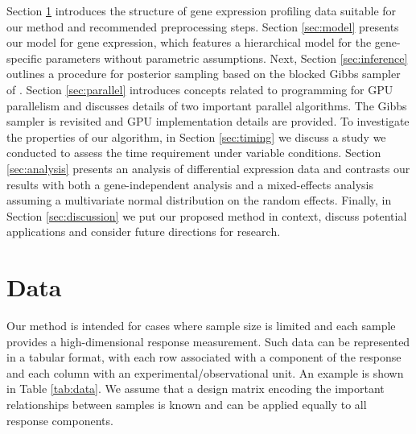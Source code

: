 Section \ref{sec:data} introduces the structure of gene expression profiling data suitable for our method and recommended preprocessing steps. Section \ref{sec:model} presents our model for gene expression, which features a hierarchical model for the gene-specific parameters without parametric assumptions. Next, Section \ref{sec:inference} outlines a procedure for posterior sampling based on the blocked Gibbs sampler of \cite{ishwaran2000}. Section \ref{sec:parallel} introduces concepts related to programming for GPU parallelism and discusses details of two important parallel algorithms. The Gibbs sampler is revisited and GPU implementation details are provided. To investigate the properties of our algorithm, in Section \ref{sec:timing} we discuss a study we conducted to assess the time requirement under variable conditions. Section \ref{sec:analysis} presents an analysis of differential expression data and contrasts our results with both a gene-independent analysis and a mixed-effects analysis assuming a multivariate normal distribution on the random effects. Finally, in Section \ref{sec:discussion} we put our proposed method in context, discuss potential applications and consider future directions for research.
\section{Data}
\label{sec:data}
Our method is intended for cases where sample size is limited and each sample provides a high-dimensional response measurement. Such data can be represented in a tabular format, with each row associated with a component of the response and each column with an experimental/observational unit. An example is shown in Table \ref{tab:data}. We assume that a design matrix encoding the important relationships between samples is known and can be applied equally to all response components.


